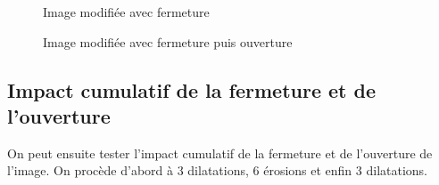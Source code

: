 \documentclass[french,a4paper,10pt]{article}
\begin{document}
\begin{figure}[!htb]
\begin{minipage}{0.30\textwidth}
			\caption{Image modifiée avec fermeture}\label{Fig:fermeture-ouverture-test-grey-08}
		\end{minipage}\hfill
		\begin{minipage}{0.30\textwidth}
			\centering
			\caption{Image modifiée avec fermeture puis ouverture}\label{Fig:ouverture-fermeture-test-grey-08}
		\end{minipage}
	\end{figure}

	\subsection{Impact cumulatif de la fermeture et de l'ouverture}\label{subsec:3.4}

	On peut ensuite tester l'impact cumulatif de la fermeture et de l'ouverture de l'image.
	On procède d'abord à 3 dilatations, 6 érosions et enfin 3 dilatations.
\end{document}
